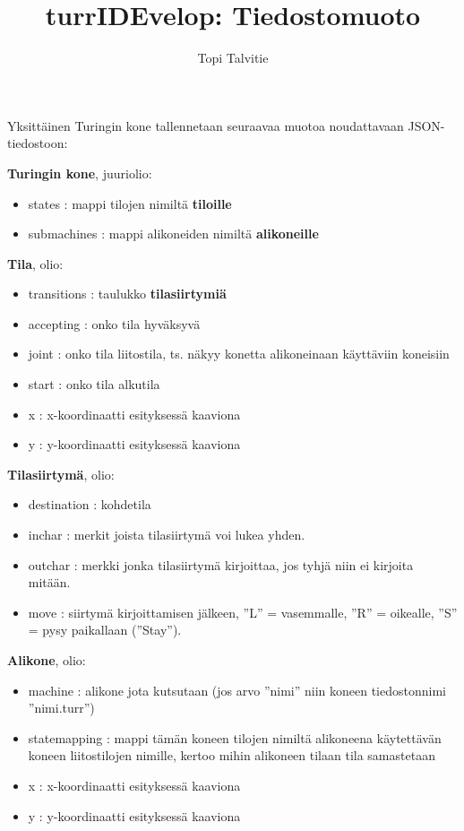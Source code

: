 \documentclass[a4paper, 11pt, finnish]{article}
\author{Topi Talvitie}
\title{turrIDEvelop: Tiedostomuoto}
\begin{document}
\maketitle

Yksittäinen Turingin kone tallennetaan seuraavaa muotoa noudattavaan
JSON-tiedostoon:

\textbf{Turingin kone}, juuriolio:
\begin{itemize}
\item states : mappi tilojen nimiltä \textbf{tiloille}
\item submachines : mappi alikoneiden nimiltä \textbf{alikoneille}
\end{itemize}

\textbf{Tila}, olio:
\begin{itemize}
\item transitions : taulukko \textbf{tilasiirtymiä}
\item accepting : onko tila hyväksyvä
\item joint : onko tila liitostila, ts. näkyy konetta alikoneinaan käyttäviin
koneisiin
\item start : onko tila alkutila
\item x : x-koordinaatti esityksessä kaaviona
\item y : y-koordinaatti esityksessä kaaviona
\end{itemize}

\textbf{Tilasiirtymä}, olio:
\begin{itemize}
\item destination : kohdetila
\item inchar : merkit joista tilasiirtymä voi lukea yhden.
\item outchar : merkki jonka tilasiirtymä kirjoittaa, jos tyhjä niin ei
kirjoita mitään.
\item move : siirtymä kirjoittamisen jälkeen, ''L'' = vasemmalle, ''R'' =
oikealle, ''S'' = pysy paikallaan (''Stay'').
\end{itemize}

\textbf{Alikone}, olio:
\begin{itemize}
\item machine : alikone jota kutsutaan (jos arvo ''nimi'' niin koneen
tiedostonnimi ''nimi.turr'')
\item statemapping : mappi tämän koneen tilojen nimiltä alikoneena käytettävän
koneen liitostilojen nimille, kertoo mihin alikoneen tilaan tila samastetaan
\item x : x-koordinaatti esityksessä kaaviona
\item y : y-koordinaatti esityksessä kaaviona
\end{itemize}
\end{document}
